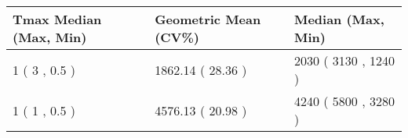 
\begin{tabular}{lll}
\toprule
Tmax Median (Max, Min) & Geometric Mean (CV\%) & Median (Max, Min)\\
\midrule
1 ( 3 , 0.5 ) & 1862.14 ( 28.36 ) & 2030 ( 3130 , 1240 )\\
1 ( 1 , 0.5 ) & 4576.13 ( 20.98 ) & 4240 ( 5800 , 3280 )\\
\bottomrule
\end{tabular}

